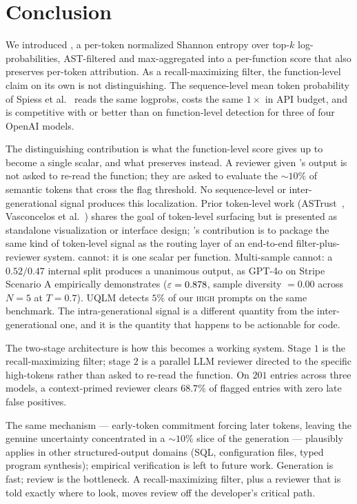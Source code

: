 \section{Conclusion}
\label{sec:conclusion}

We introduced \eps, a per-token normalized Shannon entropy over
top-$k$ log-probabilities, AST-filtered and max-aggregated into a
per-function score that also preserves per-token attribution. As a
recall-maximizing filter, the function-level claim on its own is
not distinguishing. The sequence-level mean token probability \papg
of Spiess et al.~\cite{spiess2025calibration} reads the same
logprobs, costs the same $1\times$ in API budget, and is
competitive with or better than \eps on function-level detection
for three of four OpenAI models.

The distinguishing contribution is what the function-level score
gives up to become a single scalar, and what \eps preserves instead.
A reviewer given \eps's output is not asked to re-read the function;
they are asked to evaluate the $\sim 10\%$ of semantic tokens that
cross the flag threshold. No sequence-level or inter-generational
signal produces this localization. Prior token-level work
(ASTrust~\cite{palacio2024astrust}, Vasconcelos et
al.~\cite{vasconcelos2024genprob}) shares the goal of token-level
surfacing but is presented as standalone visualization or interface
design; \eps's contribution is to package the same kind of
token-level signal as the routing layer of an end-to-end filter-plus-%
reviewer system. \papg cannot: it is one scalar per
function. Multi-sample cannot: a $0.52/0.47$ internal split
produces a unanimous output, as GPT-4o on Stripe Scenario A
empirically demonstrates ($\varepsilon = 0.878$, sample diversity $=0.00$
across $N=5$ at $T=0.7$). UQLM detects $5\%$ of our \textsc{high}
prompts on the same benchmark. The intra-generational signal is a
different quantity from the inter-generational one, and it is the
quantity that happens to be actionable for code.

The two-stage architecture is how this becomes a working system.
Stage $1$ is the recall-maximizing filter; stage $2$ is a parallel
LLM reviewer directed to the specific high-\eps tokens rather than
asked to re-read the function. On $201$ entries across three
models, a context-primed reviewer clears $68.7\%$ of flagged entries
with zero late false positives.

The same mechanism --- early-token commitment forcing later tokens,
leaving the genuine uncertainty concentrated in a $\sim 10\%$ slice
of the generation --- plausibly applies in other structured-output
domains (SQL, configuration files, typed program synthesis);
empirical verification is left to future work. Generation is fast;
review is the bottleneck. A recall-maximizing filter, plus a
reviewer that is told exactly where to look, moves review off the
developer's critical path.

